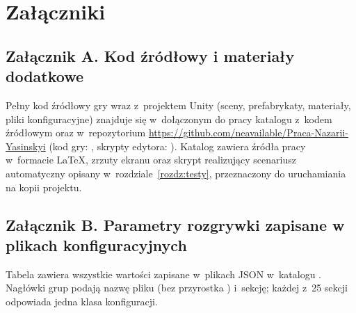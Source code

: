 \chapter*{Załączniki}

\section*{Załącznik A. Kod źródłowy i materiały dodatkowe}

Pełny kod źródłowy gry wraz z~projektem Unity (sceny, prefabrykaty, materiały, pliki
konfiguracyjne) znajduje się w~dołączonym do pracy katalogu z~kodem źródłowym oraz
w~repozytorium \url{https://github.com/neavailable/Praca-Nazarii-Yasinskyi} (kod gry:
, skrypty edytora: ). Katalog 
zawiera źródła pracy w~formacie \LaTeX, zrzuty ekranu oraz skrypt
 realizujący scenariusz automatyczny opisany
w~rozdziale~\ref{rozdz:testy}, przeznaczony do uruchamiania na kopii projektu.

\section*{Załącznik B. Parametry rozgrywki zapisane w plikach konfiguracyjnych}

Tabela zawiera wszystkie wartości zapisane w~plikach JSON w~katalogu
. Nagłówki grup podają nazwę pliku (bez przyrostka
) i~sekcję; każdej z~25 sekcji odpowiada jedna klasa konfiguracji.

